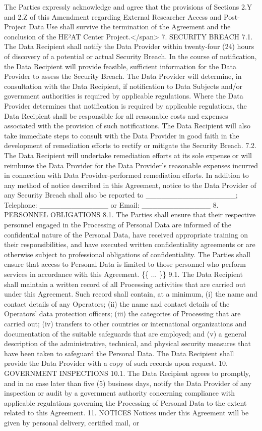 \documentclass[12pt,letterpaper]{article}
\begin{document}
The Parties expressly acknowledge and agree that the provisions of Sections 2.Y and 2.Z of this Amendment regarding External Researcher Access and Post-Project Data Use shall survive the termination of the Agreement and the conclusion of the HE²AT Center Project.</span> 7.	SECURITY BREACH 7.1.	The Data Recipient shall notify the Data Provider within twenty-four (24) hours of discovery of a potential or actual Security Breach. In the course of notification, the Data Recipient will provide feasible, sufficient information for the Data Provider to assess the Security Breach. The Data Provider will determine, in consultation with the Data Recipient, if notification to Data Subjects and/or government authorities is required by applicable regulations. Where the Data Provider determines that notification is required by applicable regulations, the Data Recipient shall be responsible for all reasonable costs and expenses associated with the provision of such notifications. The Data Recipient will also take immediate steps to consult with the Data Provider in good faith in the development of remediation efforts to rectify or mitigate the Security Breach. 7.2.	The Data Recipient will undertake remediation efforts at its sole expense or will reimburse the Data Provider for the Data Provider’s reasonable expenses incurred in connection with Data Provider-performed remediation efforts. In addition to any method of notice described in this Agreement, notice to the Data Provider of any Security Breach shall also be reported to \_\_\_\_\_\_\_\_\_\_\_\_\_\_\_\_\_; Telephone: \_\_\_\_\_\_\_\_\_\_\_\_\_ or Email: \_\_\_\_\_\_\_\_\_\_\_\_\_ 8.	PERSONNEL OBLIGATIONS 8.1.	The Parties shall ensure that their respective personnel engaged in the Processing of Personal Data are informed of the confidential nature of the Personal Data, have received appropriate training on their responsibilities, and have executed written confidentiality agreements or are otherwise subject to professional obligations of confidentiality. The Parties shall ensure that access to Personal Data is limited to those personnel who perform services in accordance with this Agreement. \{\{ ... \}\} 9.1.	The Data Recipient shall maintain a written record of all Processing activities that are carried out under this Agreement. Such record shall contain, at a minimum, (i) the name and contact details of any Operators; (ii) the name and contact details of the Operators’ data protection officers; (iii) the categories of Processing that are carried out; (iv) transfers to other countries or international organizations and documentation of the suitable safeguards that are employed; and (v) a general description of the administrative, technical, and physical security measures that have been taken to safeguard the Personal Data. The Data Recipient shall provide the Data Provider with a copy of such records upon request. 10.	GOVERNMENT INSPECTIONS 10.1.	The Data Recipient agrees to promptly, and in no case later than five (5) business days, notify the Data Provider of any inspection or audit by a government authority concerning compliance with applicable regulations governing the Processing of Personal Data to the extent related to this Agreement. 11.	NOTICES Notices under this Agreement will be given by personal delivery, certified mail, or 
\end{document}
